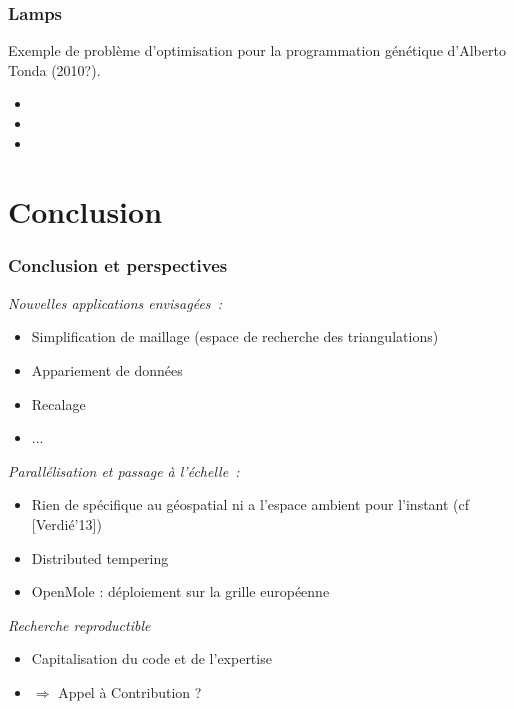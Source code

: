 \documentclass{beamer}
\begin{document}
\begin{frame}
\frametitle{Lamps}
Exemple de problème d'optimisation pour la programmation génétique d'Alberto Tonda (2010?).
\begin{itemize}
\item 
\item 
\item 
\end{itemize}
\end{frame}

\section{Conclusion}
\begin{frame}
\frametitle{Conclusion et perspectives}
\emph{Nouvelles applications envisagées~:} 
\begin{itemize}
\item Simplification de maillage (espace de recherche des triangulations)
\item Appariement de données
\item Recalage
\item ...
\end{itemize}

\emph{Parallélisation et passage à l'échelle~:} 
\begin{itemize}
\item Rien de spécifique au géospatial ni a l'espace ambient pour l'instant (cf [Verdié'13])
\item Distributed tempering
\item OpenMole : déploiement sur la grille européenne
\end{itemize}

\emph{Recherche reproductible}
\begin{itemize}
\item Capitalisation du code et de l'expertise
\item $\Rightarrow$ Appel à Contribution ?
\end{itemize}
\end{frame}
\end{document}
